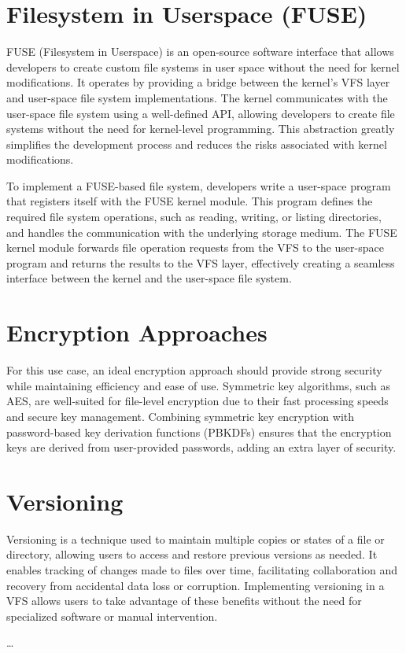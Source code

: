 \section{Filesystem in Userspace (FUSE)}\label{sec:filesystem-in-userspace-(fuse)}

FUSE (Filesystem in Userspace) is an open-source software interface that allows developers to create custom file systems in user space without the need for kernel modifications.
It operates by providing a bridge between the kernel's VFS layer and user-space file system implementations.
The kernel communicates with the user-space file system using a well-defined API, allowing developers to create file systems without the need for kernel-level programming.
This abstraction greatly simplifies the development process and reduces the risks associated with kernel modifications.

To implement a FUSE-based file system, developers write a user-space program that registers itself with the FUSE kernel module.
This program defines the required file system operations, such as reading, writing, or listing directories, and handles the communication with the underlying storage medium.
The FUSE kernel module forwards file operation requests from the VFS to the user-space program and returns the results to the VFS layer, effectively creating a seamless interface between the kernel and the user-space file system.

\section{Encryption Approaches}\label{sec:encryption-approaches}

For this use case, an ideal encryption approach should provide strong security while maintaining efficiency and ease of use.
Symmetric key algorithms, such as AES, are well-suited for file-level encryption due to their fast processing speeds and secure key management.
Combining symmetric key encryption with password-based key derivation functions (PBKDFs) ensures that the encryption keys are derived from user-provided passwords, adding an extra layer of security.

\section{Versioning}\label{sec:versioning}

Versioning is a technique used to maintain multiple copies or states of a file or directory, allowing users to access and restore previous versions as needed.
It enables tracking of changes made to files over time, facilitating collaboration and recovery from accidental data loss or corruption.
Implementing versioning in a VFS allows users to take advantage of these benefits without the need for specialized software or manual intervention.



\ldots
